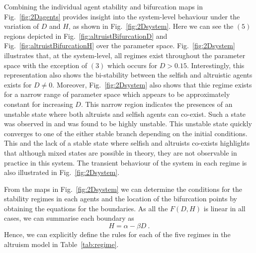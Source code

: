\documentclass[11pt]{article}
\begin{document}
Combining the individual agent stability and bifurcation maps in Fig.~\ref{fig:2Dagents} provides insight into the system-level behaviour under the variation of $D$ and $H$, as shown in Fig.~\ref{fig:2Dsystem}. Here we can see the $(5)$ regions depicted in Fig.~\ref{fig:altruistBifurcationD} and Fig.~\ref{fig:altruistBifurcationH} over the parameter space. Fig.~\ref{fig:2Dsystem} illustrates that, at the system-level, all regimes exist throughout the parameter space with the exception of $(3)$ which occurs for $D>0.15$. Interestingly, this representation also shows the bi-stability between the selfish and altruistic agents exists for $D\neq 0$. Moreover, Fig.~\ref{fig:2Dsystem} also shows that thie regime exists for a narrow range of parameter space which appears to be approximately constant for increasing $D$. This narrow region indicates the presences of an unstable state where both altruists and selfish agents can co-exist. Such a state was observed in \cite{Thomas2016ember} and was found to be highly unstable. This unstable state quickly converges to one of the either stable branch depending on the initial conditions. This and the lack of a stable state where selfish and altruists co-exists highlights that although mixed states are possible in theory, they are not observable in practice in this system. The transient behaviour of the system in each regime is also illustrated in Fig.~\ref{fig:2Dsystem}. 

From the maps in Fig.~\ref{fig:2Dsystem} we can determine the conditions for the stability regimes in each agents and the location of the bifurcation points by obtaining the equations for the boundaries. As all the $F(D,H)$ is linear in all cases, we can summarise each boundary as 
\begin{equation}
H = \alpha - \beta D~.
\end{equation} 
Hence, we can explicitly define the rules for each of the five regimes in the altruism model in Table~\ref{tab:regime}.
\end{document}
